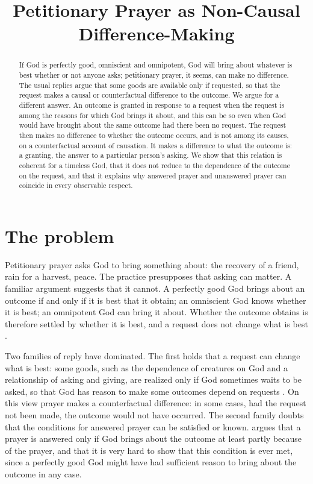 \documentclass{situationist-preprint}
\title{Petitionary Prayer as Non-Causal Difference-Making}
\begin{document}
\maketitle

\begin{abstract}
If God is perfectly good, omniscient and omnipotent, God will bring about whatever is best whether or not anyone asks; petitionary prayer, it seems, can make no difference. The usual replies argue that some goods are available only if requested, so that the request makes a causal or counterfactual difference to the outcome. We argue for a different answer. An outcome is granted in response to a request when the request is among the reasons for which God brings it about, and this can be so even when God would have brought about the same outcome had there been no request. The request then makes no difference to whether the outcome occurs, and is not among its causes, on a counterfactual account of causation. It makes a difference to what the outcome is: a granting, the answer to a particular person's asking. We show that this relation is coherent for a timeless God, that it does not reduce to the dependence of the outcome on the request, and that it explains why answered prayer and unanswered prayer can coincide in every observable respect.
\end{abstract}

\section{The problem}

Petitionary prayer asks God to bring something about: the recovery of a friend, rain for a harvest, peace. The practice presupposes that asking can matter. A familiar argument suggests that it cannot. A perfectly good God brings about an outcome if and only if it is best that it obtain; an omniscient God knows whether it is best; an omnipotent God can bring it about. Whether the outcome obtains is therefore settled by whether it is best, and a request does not change what is best \citep{Basinger1983}.

Two families of reply have dominated. The first holds that a request can change what is best: some goods, such as the dependence of creatures on God and a relationship of asking and giving, are realized only if God sometimes waits to be asked, so that God has reason to make some outcomes depend on requests \citep{Stump1979,MurrayMeyers1994}. On this view prayer makes a counterfactual difference: in some cases, had the request not been made, the outcome would not have occurred. The second family doubts that the conditions for answered prayer can be satisfied or known. \citet{Davison2017} argues that a prayer is answered only if God brings about the outcome at least partly because of the prayer, and that it is very hard to show that this condition is ever met, since a perfectly good God might have had sufficient reason to bring about the outcome in any case.
\end{document}

